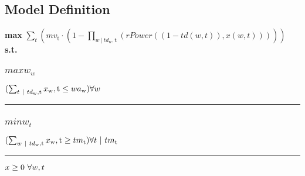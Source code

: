 \documentclass[11pt]{article}
\begin{document}
\subsection*{Model Definition}
\textbf{max} $\sum_{t} (mv_\text{t} \cdot (1 - \prod_{w ~ | ~ td_\text{w},\text{t}} ( rPower((1 - td(w,t)),x(w,t)) )))$\\
\textbf{s.t.}
\subsubsection*{$maxw_{w}$}
$
(\sum_{t ~ | ~ td_\text{w},\text{t}} x_\text{w},\text{t} \leq wa_\text{w})\hfill \forall w
$
\vspace{5pt}
\hrule
\subsubsection*{$minw_{t}$}
$
(\sum_{w ~ | ~ td_\text{w},\text{t}} x_\text{w},\text{t} \geq tm_\text{t})\hfill \forall t ~ | ~ tm_\text{t}
$
\vspace{5pt}
\hrule
\bigskip
$x\geq 0 ~ \forall w,t\\$
\end{document}
